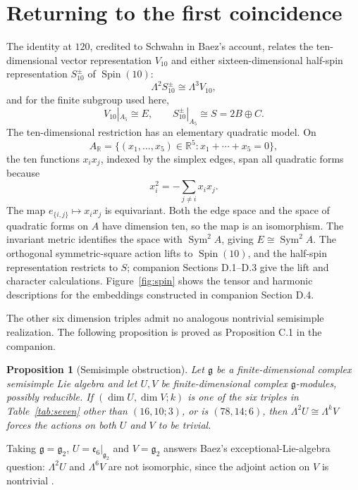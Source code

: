 \documentclass[11pt,a4paper]{article}
\newtheorem{proposition}{Proposition}
\begin{document}
\section{Returning to the first coincidence}\label{sec:spin}

The identity at $120$, credited to Schwahn in Baez's account, relates the ten-dimensional vector representation $V_{10}$ and either sixteen-dimensional half-spin representation $S_{10}^{\pm}$ of $\operatorname{Spin}(10)$:
\begin{equation}\label{eq:spin-classical-cut}
\Lambda^2S_{10}^{\pm}\cong\Lambda^3V_{10},
\end{equation}
and for the finite subgroup used here,
\[
V_{10}|_{A_5}\cong E,\qquad S_{10}^{\pm}|_{A_5}\cong S=2B\oplus C.
\]
The ten-dimensional restriction has an elementary quadratic model. On
\[
A_{\mathbb R}=\{(x_1,\ldots,x_5)\in\mathbb R^5:x_1+\cdots+x_5=0\},
\]
the ten functions $x_ix_j$, indexed by the simplex edges, span all quadratic forms because
\[
x_i^2=-\sum_{j\ne i}x_ix_j.
\]
The map $e_{\{i,j\}}\mapsto x_ix_j$ is equivariant. Both the edge space and the space of quadratic forms on $A$ have dimension ten, so the map is an isomorphism. The invariant metric identifies the space with $\operatorname{Sym}^2A$, giving $E\cong\operatorname{Sym}^2A$. The orthogonal symmetric-square action lifts to $\operatorname{Spin}(10)$, and the half-spin representation restricts to $S$; companion Sections D.1--D.3 give the lift and character calculations. Figure~\ref{fig:spin} shows the tensor and harmonic descriptions for the embeddings constructed in companion Section D.4.

The other six dimension triples admit no analogous nontrivial semisimple realization. The following proposition is proved as Proposition C.1 in the companion.

\begin{proposition}[Semisimple obstruction]\label{prop:semisimple}
Let $\mathfrak g$ be a finite-dimensional complex semisimple Lie algebra and let $U,V$ be finite-dimensional complex $\mathfrak g$-modules, possibly reducible. If $(\dim U,\dim V;k)$ is one of the six triples in Table~\ref{tab:seven} other than $(16,10;3)$, or is $(78,14;6)$, then $\Lambda^2U\cong\Lambda^kV$ forces the actions on both $U$ and $V$ to be trivial.
\end{proposition}

Taking $\mathfrak g=\mathfrak g_2$, $U=\mathfrak e_6|_{\mathfrak g_2}$ and $V=\mathfrak g_2$ answers Baez's exceptional-Lie-algebra question: $\Lambda^2U$ and $\Lambda^6V$ are not isomorphic, since the adjoint action on $V$ is nontrivial \citep{Baez2026Coincidences}.
\end{document}
